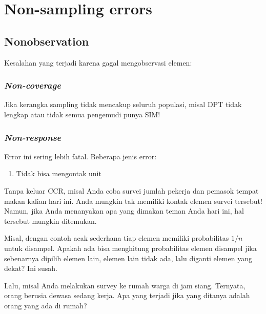 \documentclass[
  letterpaper,
  DIV=11,
  numbers=noendperiod]{scrreprt}
\providecommand{\tightlist}{%
  \setlength{\itemsep}{0pt}\setlength{\parskip}{0pt}}\usepackage{longtable,booktabs,array}
\begin{document}
\hypertarget{non-sampling-errors}{%
\section{Non-sampling errors}\label{non-sampling-errors}}

\hypertarget{nonobservation}{%
\subsection{Nonobservation}\label{nonobservation}}

Kesalahan yang terjadi karena gagal mengobservasi elemen:

\hypertarget{non-coverage}{%
\subsubsection{\texorpdfstring{\emph{Non-coverage}}{Non-coverage}}\label{non-coverage}}

Jika kerangka sampling tidak mencakup seluruh populasi, misal DPT tidak
lengkap atau tidak semua pengemudi punya SIM!

\hypertarget{non-response}{%
\subsubsection{\texorpdfstring{\emph{Non-response}}{Non-response}}\label{non-response}}

Error ini sering lebih fatal. Beberapa jenis error:

\begin{enumerate}
\def\labelenumi{\arabic{enumi}.}
\tightlist
\item
  Tidak bisa mengontak unit
\end{enumerate}

Tanpa keluar CCR, misal Anda coba survei jumlah pekerja dan pemasok
tempat makan kalian hari ini. Anda mungkin tak memiliki kontak elemen
survei tersebut! Namun, jika Anda menanyakan apa yang dimakan teman Anda
hari ini, hal tersebut mungkin ditemukan.

Misal, dengan contoh acak sederhana tiap elemen memiliki probabilitas
\(1/n\) untuk disampel. Apakah ada bisa menghitung probabilitas elemen
disampel jika sebenarnya dipilih elemen lain, elemen lain tidak ada,
lalu diganti elemen yang dekat? Ini susah.

Lalu, misal Anda melakukan survey ke rumah warga di jam siang. Ternyata,
orang berusia dewasa sedang kerja. Apa yang terjadi jika yang ditanya
adalah orang yang ada di rumah?
\end{document}
